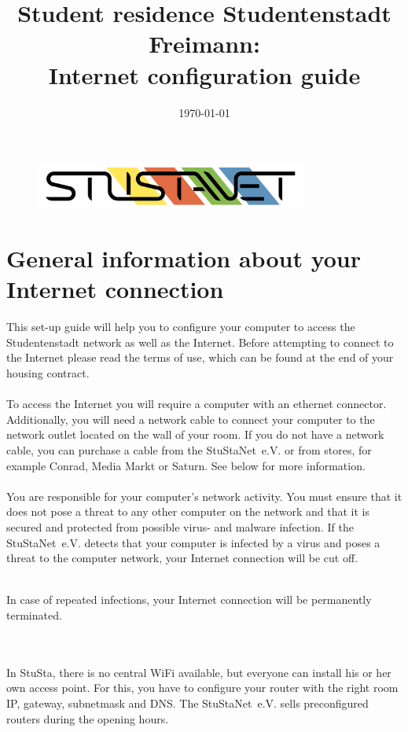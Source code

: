 \documentclass[a4paper,12pt]{scrartcl}
\title{Student residence Studentenstadt Freimann:\\
       Internet configuration guide}
\date{\today}
\begin{document}
\maketitle

\begin{figure}[t!]
   \centering
   \vspace{-20pt}
   \includegraphics[width=0.8\textwidth,keepaspectratio]{Bilder/StuStaNet_Logo}
   \vspace{-20pt}
\end{figure}

\section*{General information about your Internet connection}

This set-up guide will help you to configure your computer to access the Studentenstadt network as well as the Internet. Before attempting to connect to the Internet please read the terms of use, which can be found at the end of your housing contract.
\\
\\
To access the Internet you will require a computer with an ethernet connector. Additionally, you will need a network cable to connect your computer to the network outlet located on the wall of your room. If you do not have a network cable, you can purchase a cable from the StuStaNet~e.V. or from stores, for example Conrad, Media Markt or Saturn. See below for more information.
\\
\\
You are responsible for your computer's network activity. You must ensure that it does not pose a threat to any other computer on the network and that it is secured and protected from possible virus- and malware infection. If the StuStaNet~e.V. detects that your computer is infected by a virus and poses a threat to the computer network, your Internet connection will be cut off.
\\
\begin{bfseries}
	\\In case of repeated infections, your Internet connection will be permanently terminated.
\end{bfseries}
\\
\\
In StuSta, there is no central WiFi available, but everyone can install his or her own access point. For this, you have to configure your router with the right room IP, gateway, subnetmask and DNS. The StuStaNet~e.V. sells preconfigured routers during the opening hours.
\end{document}
